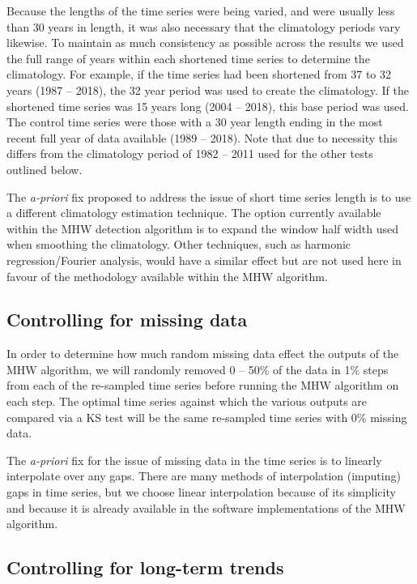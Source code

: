 \documentclass[]{article}
\begin{document}
Because the lengths of the time series were being varied, and were
usually less than 30 years in length, it was also necessary that the
climatology periods vary likewise. To maintain as much consistency as
possible across the results we used the full range of years within each
shortened time series to determine the climatology. For example, if the
time series had been shortened from 37 to 32 years (1987 -- 2018), the
32 year period was used to create the climatology. If the shortened time
series was 15 years long (2004 -- 2018), this base period was used. The
control time series were those with a 30 year length ending in the most
recent full year of data available (1989 -- 2018). Note that due to
necessity this differs from the climatology period of 1982 -- 2011 used
for the other tests outlined below.

The \emph{a-priori} fix proposed to address the issue of short time
series length is to use a different climatology estimation technique.
The option currently available within the MHW detection algorithm is to
expand the window half width used when smoothing the climatology. Other
techniques, such as harmonic regression/Fourier analysis, would have a
similar effect but are not used here in favour of the methodology
available within the MHW algorithm.

\hypertarget{controlling-for-missing-data}{%
\subsection{Controlling for missing
data}\label{controlling-for-missing-data}}

In order to determine how much random missing data effect the outputs of
the MHW algorithm, we will randomly removed 0 -- 50\% of the data in 1\%
steps from each of the re-sampled time series before running the MHW
algorithm on each step. The optimal time series against which the
various outputs are compared via a KS test will be the same re-sampled
time series with 0\% missing data.

The \emph{a-priori} fix for the issue of missing data in the time series
is to linearly interpolate over any gaps. There are many methods of
interpolation (imputing) gaps in time series, but we choose linear
interpolation because of its simplicity and because it is already
available in the software implementations of the MHW algorithm.

\hypertarget{controlling-for-long-term-trends}{%
\subsection{Controlling for long-term
trends}\label{controlling-for-long-term-trends}}
\end{document}
